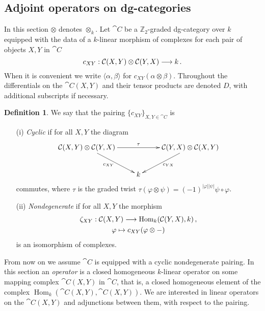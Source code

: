 \documentclass{compositio}
\theoremstyle{definition}
\newtheorem{definition}[theorem]{Definition}
\newtheorem{remark}[theorem]{Remark}
\numberwithin{equation}{section}
\def\Hom{\operatorname{Hom}}
\begin{document}
\subsection{Adjoint operators on dg-categories}\label{section:adjointopdg}

In this section $\otimes$ denotes $\otimes_k$. Let $\cat{C}$ be a $\mathbb{Z}_2$-graded dg-category over $k$ equipped with the data of a $k$-linear morphism of complexes for each pair of objects $X,Y$ in $\cat{C}$
\[
c_{XY}: \mathcal{C}(X,Y) \otimes \mathcal{C}(Y,X) \longrightarrow k\,.
\]
When it is convenient we write $\langle \alpha, \beta \rangle$ for $c_{XY}(\alpha \otimes \beta)$. Throughout the differentials on the $\cat{C}(X,Y)$ and their tensor products are denoted $D$, with additional subscripts if necessary.

\begin{definition}\label{defn:nondegpair} We say that the pairing $\{ c_{XY} \}_{X,Y \in \cat{C}}$ is
\begin{itemize}
\item[(i)] \emph{Cyclic} if for all $X,Y$ the diagram
\[
\xymatrix{
\cat{C}(X,Y) \otimes \cat{C}(Y,X) \ar[dr]_{c_{XY}}\ar[rr]^\tau & & \cat{C}(Y,X) \otimes \cat{C}(X,Y) \ar[dl]^{c_{YX}}\\
& k
}
\]
commutes, where $\tau$ is the graded twist $\tau( \varphi \otimes \psi) = (-1)^{|\varphi||\psi|} \psi \circ \varphi$. 
\item[(ii)] \emph{Nondegenerate} if for all $X,Y$ the morphism
\begin{gather*}
\zeta_{XY}: \cat{C}(X,Y) \lto \Hom_k( \cat{C}(Y,X), k)\,,\\
\varphi \mapsto c_{XY}( \varphi \otimes - )
\end{gather*}
is an isomorphism of complexes.
\end{itemize}
\end{definition}


From now on we assume $\cat{C}$ is equipped with a cyclic nondegenerate pairing. In this section an \emph{operator} is a closed homogeneous $k$-linear operator on some mapping complex $\cat{C}(X,Y)$ in $\cat{C}$, that is, a closed homogeneous element of the complex $\Hom_k( \cat{C}(X,Y), \cat{C}(X,Y) )$. We are interested in linear operators on the $\cat{C}(X,Y)$ and adjunctions between them, with respect to the pairing.
\end{document}
